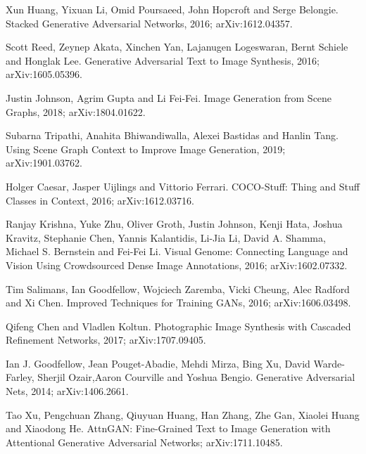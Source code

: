 \documentclass{article}
\begin{document}

\begin{thebibliography}{1}

\medskip
\small


Xun Huang, Yixuan Li, Omid Poursaeed, John Hopcroft and Serge Belongie.
\newblock Stacked Generative Adversarial Networks, 2016;
\newblock arXiv:1612.04357.

Scott Reed, Zeynep Akata, Xinchen Yan, Lajanugen Logeswaran, Bernt Schiele and Honglak Lee.
\newblock Generative Adversarial Text to Image Synthesis, 2016;
\newblock arXiv:1605.05396.

Justin Johnson, Agrim Gupta and Li Fei-Fei.
\newblock Image Generation from Scene Graphs, 2018;
\newblock arXiv:1804.01622.

Subarna Tripathi, Anahita Bhiwandiwalla, Alexei Bastidas and Hanlin Tang.
\newblock Using Scene Graph Context to Improve Image Generation, 2019;
\newblock arXiv:1901.03762.

Holger Caesar, Jasper Uijlings and Vittorio Ferrari.
\newblock COCO-Stuff: Thing and Stuff Classes in Context, 2016;
\newblock arXiv:1612.03716.

Ranjay Krishna, Yuke Zhu, Oliver Groth, Justin Johnson, Kenji Hata, Joshua Kravitz, Stephanie Chen, Yannis Kalantidis, Li-Jia Li, David A. Shamma, Michael S. Bernstein and Fei-Fei Li.
\newblock Visual Genome: Connecting Language and Vision Using Crowdsourced Dense Image Annotations, 2016;
\newblock arXiv:1602.07332.

Tim Salimans, Ian Goodfellow, Wojciech Zaremba, Vicki Cheung, Alec Radford and Xi Chen.
\newblock Improved Techniques for Training GANs, 2016;
\newblock arXiv:1606.03498.


Qifeng Chen and Vladlen Koltun.
\newblock Photographic Image Synthesis with Cascaded Refinement Networks, 2017;
\newblock arXiv:1707.09405.

Ian J. Goodfellow,
Jean Pouget-Abadie, Mehdi Mirza, Bing Xu, David Warde-Farley, Sherjil Ozair,Aaron Courville and Yoshua Bengio.
\newblock Generative Adversarial Nets, 2014;
\newblock arXiv:1406.2661.

Tao Xu, Pengchuan Zhang, Qiuyuan Huang,
Han Zhang, Zhe Gan, Xiaolei Huang and Xiaodong He.
\newblock AttnGAN: Fine-Grained Text to Image Generation with Attentional Generative Adversarial Networks;
\newblock arXiv:1711.10485.


\end{thebibliography}
\end{document}
